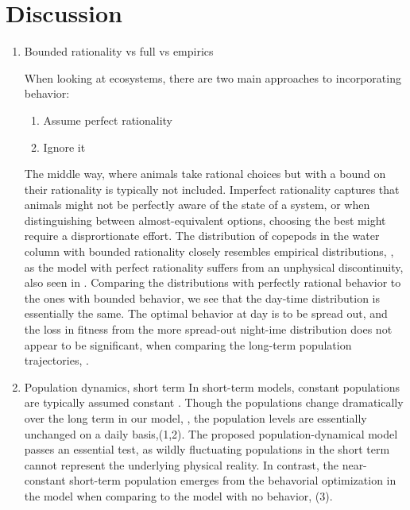 \section{Discussion}


\begin{enumerate}
  \item Bounded rationality vs full vs empirics

  When looking at ecosystems, there are two main approaches to incorporating behavior:
  \begin{enumerate}
    \item Assume perfect rationality
    \item Ignore it
  \end{enumerate}
  The middle way, where animals take rational choices but with a bound on their rationality is typically not included. Imperfect rationality captures that animals might not be perfectly aware of the state of a system, or when distinguishing between almost-equivalent options, choosing the best might require a disprortionate effort. The distribution of copepods in the water column with bounded rationality closely resembles empirical distributions, \citep{thomasetal}, as the model with perfect rationality suffers from an unphysical discontinuity, also seen in \citep{uhth}. Comparing the distributions with perfectly rational behavior to the ones with bounded behavior, we see that the day-time distribution is essentially the same. The optimal behavior at day is to be spread out, and the loss in fitness from the more spread-out night-ime distribution does not appear to be significant, when comparing the long-term population trajectories, .

  \item Population dynamics, short term
In short-term models, constant populations are typically assumed constant \citep{...,...,...}. Though the populations change dramatically over the long term in our model, , the population levels are essentially unchanged on a daily basis,(1,2). The proposed population-dynamical model passes an essential test, as wildly fluctuating populations in the short term cannot represent the underlying physical reality. In contrast, the near-constant short-term population emerges from the behavorial optimization in the model when comparing to the model with no behavior, (3).



\end{enumerate}
